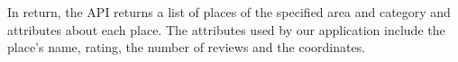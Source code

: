 

In return, the API returns a list of places of the specified area and category
and attributes about each place. The attributes used by our application include
the place's name, rating, the number of reviews and the coordinates. 





